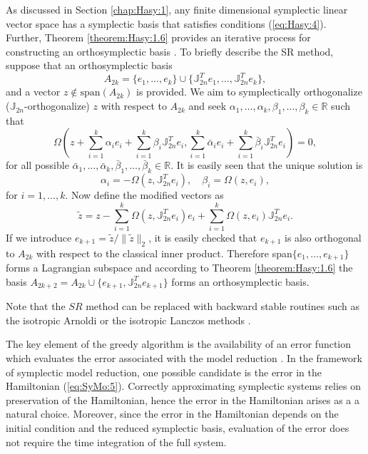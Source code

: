 {\edit
As discussed in Section \ref{chap:Hasy:1}, any finite dimensional symplectic linear vector space has a symplectic basis that satisfies conditions (\ref{eq:Hasy:4}). Further, Theorem \ref{theorem:Hasy:1.6} provides an iterative process for constructing an orthosymplectic basis \cite{Matsuo:2014wl,Salam2014}. To briefly describe the SR method, suppose that an orthosymplectic basis
\begin{equation} \label{eq:SyMo:14.1}
	A_{2k}=\{ e_1 , \dots , e_k \} \cup \{ \mathbb J_{2n}^T e_1 , \dots , \mathbb J_{2n}^T e_k \},
\end{equation}
and a vector $z\not \in \text{span}(A_{2k})$ is provided. We aim to symplectically orthogonalize ($\mathbb J_{2n}$-orthogonalize) $z$ with respect to $A_{2k}$ and seek $\alpha_1,\dots,\alpha_k,\beta_1,\dots,\beta_k \in \mathbb R$ such that
\begin{equation} \label{eq:SyMo:14.2}
	\Omega\left(z + \sum_{i=1}^k \alpha_i e_i + \sum_{i=1}^k \beta_i \mathbb J_{2n}^Te_i , \sum_{i=1}^k \bar{\alpha}_i e_i + \sum_{i=1}^k \bar{\beta}_i \mathbb J_{2n}^Te_i \right) = 0,
\end{equation}
for all possible $\bar{\alpha}_1,\dots,\bar{\alpha}_k,\bar{\beta}_1,\dots,\bar{\beta}_k \in \mathbb R$. It is easily seen that the unique solution is 
\begin{equation} \label{eq:SyMo:14.3}
	\alpha_i = - \Omega(z,\mathbb J_{2n}^Te_i), \quad \beta_i = \Omega(z,e_i),
\end{equation}
for $i=1,\dots,k$. Now define the modified vectors as
\begin{equation} \label{eq:SyMo:14.4}
	\tilde z = z - \sum_{i=1}^k \Omega(z,\mathbb J_{2n}^Te_i) e_i + \sum_{i=1}^k \Omega(z,e_i) \mathbb J_{2n}^Te_i.
\end{equation}
If we introduce $e_{k+1} = \tilde z / \| \tilde z \|_2$, it is easily checked that $e_{k+1}$ is also orthogonal to $A_{2k}$ with respect to the classical inner product. Therefore span$\{e_1,\dots,e_{k+1}\}$ forms a Lagrangian subspace and according to Theorem \ref{theorem:Hasy:1.6} the basis $A_{2k+2}= A_{2k}\cup \{ e_{k+1} , \mathbb J_{2n}^T e_{k+1} \}$ forms an orthosymplectic basis.

Note that the $SR$ method can be replaced with backward stable routines such as the isotropic Arnoldi or the isotropic Lanczos methods \cite{Mehrmann:2000dv}.
}

The key element of the greedy algorithm is the availability of an error function which evaluates the error associated with the model reduction \cite{Anonymous:2016wl}. In the framework of symplectic model reduction, one possible candidate is the error in the Hamiltonian (\ref{eq:SyMo:5}). Correctly approximating symplectic systems relies on preservation of the Hamiltonian, hence the error in the Hamiltonian {\edit arises as a} a natural choice. Moreover, since the error in the Hamiltonian depends on the initial condition and the reduced symplectic basis, evaluation of the error does not require the time integration of the full system. 

